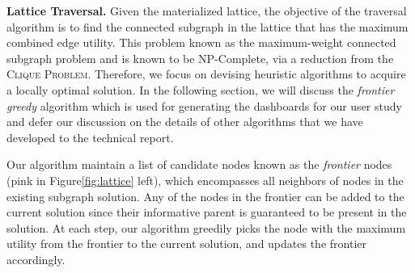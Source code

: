 \textbf{Lattice Traversal.} Given the materialized lattice, the objective of the traversal algorithm is to find the connected subgraph in the lattice that has the maximum combined edge utility. This problem known as the maximum-weight connected subgraph problem\cite{ErnstAlthaus2009} and is known to be NP-Complete, via a reduction from the \textsc{Clique Problem}. Therefore, we focus on devising heuristic algorithms to acquire a locally optimal solution. In the following section, we will discuss the \textit{frontier greedy} algorithm which is used for generating the dashboards for our user study and defer our discussion on the details of other algorithms that we have developed to the technical report.
\par Our algorithm maintain a list of candidate nodes known as the \textit{frontier} nodes (pink in Figure\ref{fig:lattice} left), which encompasses all neighbors of nodes in the existing subgraph solution. Any of the nodes in the frontier can be added to the current solution since their informative parent is guaranteed to be present in the solution. At each step, our algorithm greedily picks the node with the maximum utility from the frontier to the current solution, and updates the frontier accordingly. 
